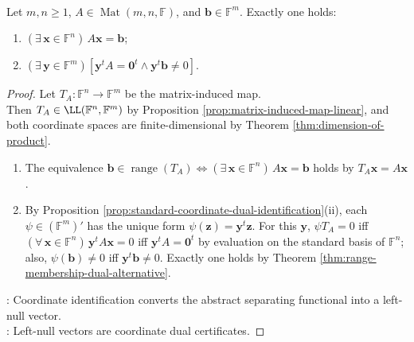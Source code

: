 \begin{corollary} \label{cor:matrix-equation-left-nullspace-alternative} \\
Let $m,n\geq1$, $A\in\operatorname{Mat}(m,n,\mathbb{F})$, and $\mathbf{b}\in\mathbb{F}^m$. Exactly one holds:
\begin{enumerate}[label=(\roman*)]
\setlength{\itemsep}{0pt}
\item $(\exists\,\mathbf{x}\in\mathbb{F}^n)\,A\mathbf{x}=\mathbf{b}$;
\item $(\exists\,\mathbf{y}\in\mathbb{F}^m)[\mathbf{y}^tA=\mathbf{0}^t\land\mathbf{y}^t\mathbf{b}\neq0]$.
\end{enumerate}
\begin{proof}
Let $T_A:\mathbb{F}^n\to\mathbb{F}^m$ be the matrix-induced map.\\
Then $T_A\in\LL(\mathbb{F}^n,\mathbb{F}^m)$ by Proposition \ref{prop:matrix-induced-map-linear}, and both coordinate spaces are finite-dimensional by Theorem \ref{thm:dimension-of-product}.
\begin{enumerate}[label=(\roman*)]
\setlength{\itemsep}{0pt}
\item The equivalence $\mathbf{b}\in\operatorname{range}(T_A)\iff(\exists\,\mathbf{x}\in\mathbb{F}^n)\,A\mathbf{x}=\mathbf{b}$ holds by $T_A\mathbf{x}=A\mathbf{x}$.
\item By Proposition \ref{prop:standard-coordinate-dual-identification}(ii), each $\psi\in(\mathbb{F}^m)'$ has the unique form $\psi(\mathbf{z})=\mathbf{y}^t\mathbf{z}$. For this $\mathbf{y}$, $\psi T_A=0$ iff $(\forall\,\mathbf{x}\in\mathbb{F}^n)\,\mathbf{y}^tA\mathbf{x}=0$ iff $\mathbf{y}^tA=\mathbf{0}^t$ by evaluation on the standard basis of $\mathbb{F}^n$; also, $\psi(\mathbf{b})\neq0$ iff $\mathbf{y}^t\mathbf{b}\neq0$. Exactly one holds by Theorem \ref{thm:range-membership-dual-alternative}.
\end{enumerate}
: Coordinate identification converts the abstract separating functional into a left-null vector.\\
: Left-null vectors are coordinate dual certificates.
\end{proof}
\end{corollary}

